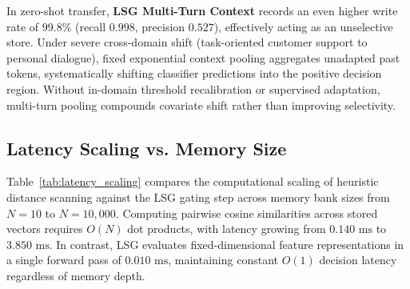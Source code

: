 \documentclass[journal]{IEEEtran}
\begin{document}
In zero-shot transfer, \textbf{LSG Multi-Turn Context} records an even higher write rate of $99.8\%$ (recall $0.998$, precision $0.527$), effectively acting as an unselective store. Under severe cross-domain shift (task-oriented customer support to personal dialogue), fixed exponential context pooling aggregates unadapted past tokens, systematically shifting classifier predictions into the positive decision region. Without in-domain threshold recalibration or supervised adaptation, multi-turn pooling compounds covariate shift rather than improving selectivity.

\begin{table}[!t]
\centering
\caption{Inference latency scaling with memory store size $N$. Pairwise cosine similarity scans all $N$ entries ($O(N)$), whereas LSG executes a single forward pass in constant time ($O(1)$). To isolate the scaling mechanism, times reflect the decision step alone, excluding common embedding extraction.}
\label{tab:latency_scaling}
\end{table}

\subsection{Latency Scaling vs. Memory Size}
Table~\ref{tab:latency_scaling} compares the computational scaling of heuristic distance scanning against the LSG gating step across memory bank sizes from $N=10$ to $N=10,000$. Computing pairwise cosine similarities across stored vectors requires $O(N)$ dot products, with latency growing from $0.140\text{ ms}$ to $3.850\text{ ms}$. In contrast, LSG evaluates fixed-dimensional feature representations in a single forward pass of $0.010\text{ ms}$, maintaining constant $O(1)$ decision latency regardless of memory depth.
\end{document}
